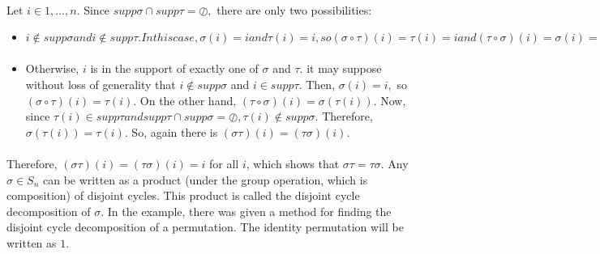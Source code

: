 \paragraph{}
Let $i\in{1, . . . , n}.$ Since $supp \sigma\cap supp \tau = \oslash,$ there are only two possibilities:
\begin{itemize}
\item $i \notin supp \sigma and i \notin supp \tau. In this case, \sigma(i) = i and \tau(i) = i, so (\sigma \circ \tau)(i) =\tau(i) = i and
(\tau \circ \sigma)(i) = \sigma(i) = i.$
\paragraph{}
\item Otherwise, $i$ is in the support of exactly one of $\sigma$ and $\tau$. it may suppose without loss of generality that
$i \notin supp \sigma$ and $i \in supp \tau.$ Then, $\sigma(i) = i,$ so $(\sigma \circ \tau)(i) = \tau(i).$ On the other hand, $(\tau \circ \sigma)(i) = \sigma(\tau(i)).$
Now, since $\tau(i) \in supp \tau and supp \tau \cap supp \sigma = \oslash, \tau(i) \notin supp \sigma.$ Therefore, $\sigma(\tau(i)) = \tau(i).$ So,
again there is $(\sigma\tau)(i) = (\tau\sigma)(i).$
\end{itemize}
\paragraph{}
Therefore, $(\sigma \tau)(i) = (\tau \sigma)(i) = i$ for all $i$, which shows that $\sigma \tau= \tau \sigma$.
Any $\sigma \in S_n$ can be written as a product (under the group operation, which is composition) of disjoint cycles.
This product is called the disjoint cycle decomposition of $\sigma.$ In the example, there was given a method for finding
the disjoint cycle decomposition of a permutation.
The identity permutation will be written as $1$.
